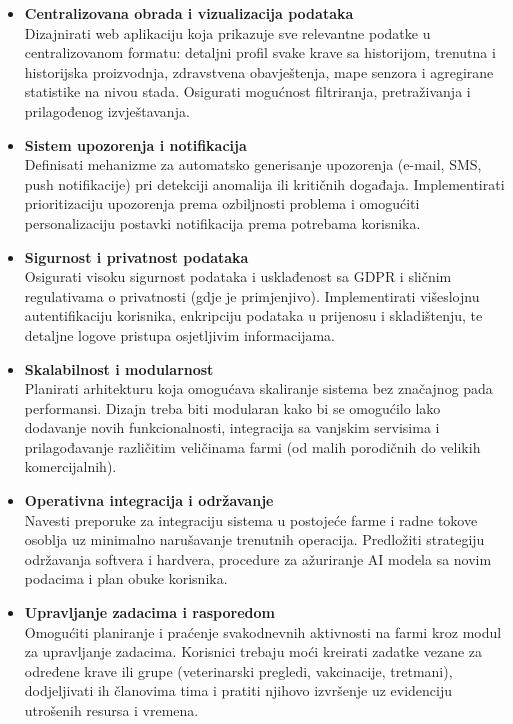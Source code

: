 \documentclass{article}
\begin{document}
\begin{itemize}
\item \textbf{Centralizovana obrada i vizualizacija podataka}\\
Dizajnirati web aplikaciju koja prikazuje sve relevantne podatke u centralizovanom formatu: detaljni profil svake krave sa historijom, trenutna i historijska proizvodnja, zdravstvena obavještenja, mape senzora i agregirane statistike na nivou stada. Osigurati mogućnost filtriranja, pretraživanja i prilagođenog izvještavanja.

\item \textbf{Sistem upozorenja i notifikacija}\\
Definisati mehanizme za automatsko generisanje upozorenja (e-mail, SMS, push notifikacije) pri detekciji anomalija ili kritičnih događaja. Implementirati prioritizaciju upozorenja prema ozbiljnosti problema i omogućiti personalizaciju postavki notifikacija prema potrebama korisnika.

\item \textbf{Sigurnost i privatnost podataka}\\
Osigurati visoku sigurnost podataka i usklađenost sa GDPR i sličnim regulativama o privatnosti (gdje je primjenjivo). Implementirati višeslojnu autentifikaciju korisnika, enkripciju podataka u prijenosu i skladištenju, te detaljne logove pristupa osjetljivim informacijama.

\item \textbf{Skalabilnost i modularnost}\\
Planirati arhitekturu koja omogućava skaliranje sistema bez značajnog pada performansi. Dizajn treba biti modularan kako bi se omogućilo lako dodavanje novih funkcionalnosti, integracija sa vanjskim servisima i prilagođavanje različitim veličinama farmi (od malih porodičnih do velikih komercijalnih).

\item \textbf{Operativna integracija i održavanje}\\
Navesti preporuke za integraciju sistema u postojeće farme i radne tokove osoblja uz minimalno narušavanje trenutnih operacija. Predložiti strategiju održavanja softvera i hardvera, procedure za ažuriranje AI modela sa novim podacima i plan obuke korisnika.

\item \textbf{Upravljanje zadacima i rasporedom}\\
Omogućiti planiranje i praćenje svakodnevnih aktivnosti na farmi kroz modul za upravljanje zadacima. Korisnici trebaju moći kreirati zadatke vezane za određene krave ili grupe (veterinarski pregledi, vakcinacije, tretmani), dodjeljivati ih članovima tima i pratiti njihovo izvršenje uz evidenciju utrošenih resursa i vremena.


\end{itemize}
\end{document}
